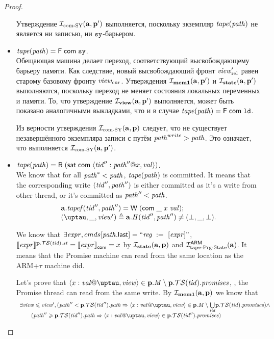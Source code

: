 \begin{proof}
\begin{itemize}
     Утверждение $\mathcal{I}_{\textup{\rm com-SY}}(\mathbf{a}, \mathbf{p}')$ выполняется, поскольку экземпляр $\mathit{tape}(\mathit{path})$ не является ни записью,
     ни $\mathtt{sy}$-барьером.

   \item $\mathit{tape}(\mathit{path}) = \textsf{F} \; \mathsf{com} \; \mathtt{sy}$. \\
    Обещающая машина делает переход, соответствующий высвобождающему барьеру памяти.
    Как следствие, новый высвобождающий фронт $\mathit{view}_{\mathrm{rel}}'$ равен старому базовому фронту $\mathit{view}_{\mathrm{cur}}$.
    Утверждения $\mathcal{I}_{\rm \bf mem1}(\mathbf{a}, \mathbf{p}')$ и $\mathcal{I}_{\rm \bf state}(\mathbf{a}, \mathbf{p}')$ выполняются, поскольку
    переход не меняет состояния локальных переменных и памяти.
    То, что утверждение $\mathcal{I}_{\rm \bf view}(\mathbf{a}, \mathbf{p}')$ выполняется, может быть показано аналогичными выкладками,
    что и в случае $\mathit{tape}(\mathit{path}) = \textsf{F} \; \mathsf{com} \; \mathtt{ld}$.
     
    Из верности утверждения $\mathcal{I}_{\textup{\rm com-SY}}(\mathbf{a}, \mathbf{p})$ следует, что
    не существует незавершённого экземпляра записи с путём $\mathit{path}^{write} > \mathit{path}$.
    Это означает, что выполняется $\mathcal{I}_{\textup{\rm com-SY}}(\mathbf{a}, \mathbf{p}')$.

    \item  $\mathit{tape}(\mathit{path}) = \textsf{R} \; (\mathsf{sat} \; \mathsf{com} \; \langle \mathit{tid}'': \mathit{path}''@ x,\mathit{val} \rangle)$. \\
      We know that for all $\mathit{path}^{*} < \mathit{path}$, $\mathit{tape}(\mathit{path})$ is committed. It means that
      the corresponding write $(\mathit{tid}'', \mathit{path}'')$ is either committed as it's a write from other thread,
      or it's committed as $\mathit{path}'' < \mathit{path}$.
      \[\begin{array}{l}
      \aT.\tapef(\tId'', \cpath'') = \tapeWrite{(\tapeWriteCommitted{\_}{x}{\stval})}; \\
      (\tau, \_, \R') \triangleq \aT.\hmap(\tId'', \cpath'') \not = (\bot, \_ , \bot). \\
      \end{array}\]
      
      We know that $\exists \mathit{expr}, {cmds}[\mathit{path}.\textup{\sf last}] = ``\mathit{reg} \;:=_{}\;[\mathit{expr}]"$,
      $\llbracket\mathit{expr}\rrbracket ^{\mathbf{p}.\mathcal{TS}(\mathit{tid}).\mathit{st}} = \llbracket\mathit{expr}\rrbracket ^{}_\mathsf{com} = x$ by $\mathcal{I}_{\rm \bf state}(\mathbf{a}, \mathbf{p})$ and $\mathcal{I}^\mathsf{ARM}_{\textup{\rm {tape-Prg-State}}}(\mathbf{a})$.
      It means that the Promise machine can read from the same location as the ARM+$\tau$ machine did.

   Let's prove that $\writeEvt{x}{\stval}{\tau}{\R} \in \p.\Mprom \setminus \p.\TSfprom(\tId).\PromSet$, \ie,
   the Promise thread can read from the same write. By $\mathcal{I}_{\rm \bf mem1}(\mathbf{a}, \mathbf{p})$ we know that
   \[\begin{array}{l}
     \exists \R \le \R',
     (\cpath'' < \p.\TSfprom(\tId'').\cpath => \writeEvt{x}{\stval}{\tau}{\R} \in \p.\Mprom \setminus \underset{\tId}{\bigcup} \p.\TSfprom(\tId).\PromSet) \land \\
    \quad \quad (\cpath'' \ge \p.\TSfprom(\tId'').\cpath => \writeEvt{x}{\stval}{\tau}{\R} \in \p.\TSfprom(\tId'').\PromSet) \\
   \end{array}\]


\end{itemize}
\end{proof}
